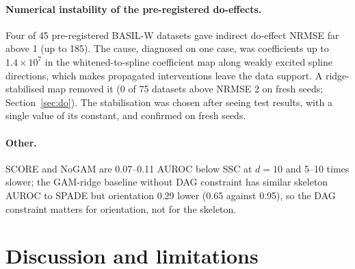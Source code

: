 \documentclass[11pt,a4paper]{article}
\begin{document}
\paragraph{Numerical instability of the pre-registered do-effects.} Four of 45 pre-registered BASIL-W datasets gave indirect do-effect NRMSE far above 1 (up to 185). The cause, diagnosed on one case, was coefficients up to $1.4\times10^7$ in the whitened-to-spline coefficient map along weakly excited spline directions, which makes propagated interventions leave the data support. A ridge-stabilised map removed it (0 of 75 datasets above NRMSE 2 on fresh seeds; Section~\ref{sec:do}). The stabilisation was chosen after seeing test results, with a single value of its constant, and confirmed on fresh seeds.\label{sec:do-instab}

\paragraph{Other.} SCORE and NoGAM are 0.07--0.11 AUROC below SSC at $d=10$ and 5--10 times slower; the GAM-ridge baseline without DAG constraint has similar skeleton AUROC to SPADE but orientation 0.29 lower (0.65 against 0.95), so the DAG constraint matters for orientation, not for the skeleton.

\section{Discussion and limitations}
\label{sec:discussion}
\end{document}

